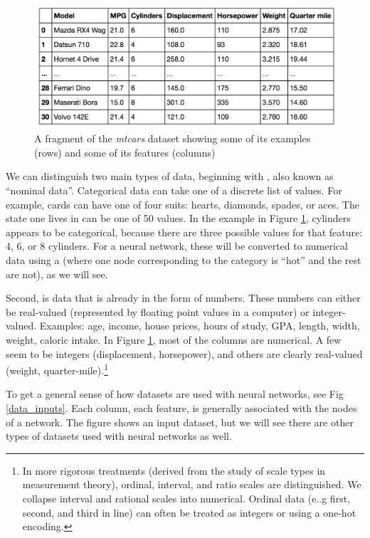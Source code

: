\begin{figure}[h]
\centering
\includegraphics[scale=0.6]{./images/CarsBase.png}
\caption[Screenshot of the Motor Trend Car Road Tests dataset included with R.]{A fragment of  the \emph {mtcars} dataset showing some of its examples (rows) and some of its features (columns) }
\label{cars_dataset}
\end{figure}

We can distinguish two main types of data, beginning with , also known as ``nominal data''. Categorical data can take one of a discrete list of values. For example, cards can have one of four suits: hearts, diamonds, spades, or aces. The state one lives in can be one of 50 values. In the example in  Figure \ref{cars_dataset}, cylinders appears to be categorical, because there are three possible values for that feature: 4, 6, or 8 cylinders. For a neural network, these will be converted to numerical data using a  (where one node corresponding to the category is ``hot'' and the rest are not), as we will see. 

Second,  is data that is already in the form of numbers. These numbers can either be real-valued (represented by floating point values in a computer) or integer-valued. Examples: age, income, house prices, hours of study, GPA, length, width, weight, caloric intake. In Figure \ref{cars_dataset}, most of the columns are numerical. A few seem to be integers (displacement, horsepower), and others are clearly real-valued (weight, quarter-mile).\footnote{ In more rigorous treatments (derived from the study of scale types in measurement theory), ordinal, interval, and ratio scales are distinguished. We collapse interval and rational scales into numerical. Ordinal data (e..g first, second, and third in line) can often be treated as integers or using a one-hot encoding.}

To get a general sense of how datasets are used with neural networks, see Fig \ref{data_inputs}. Each column, each feature, is generally associated with the nodes of a network. The figure shows an input dataset, but we will see there are other types of datasets used with neural networks as well.

